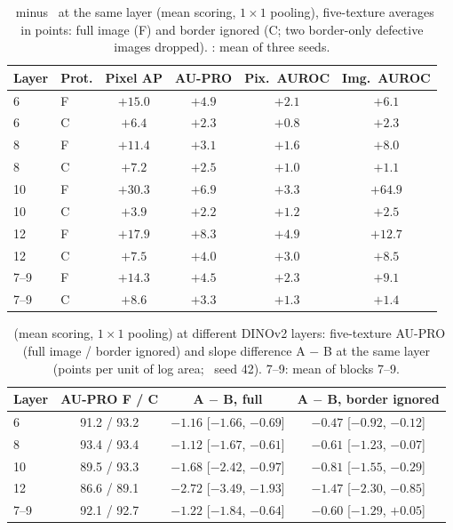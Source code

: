 \begin{table}[t]
\centering
\caption{\RB\ minus \RA\ at the same layer (mean scoring, $1\times1$
pooling), five-texture averages in points: full image (F) and border ignored
(C; two border-only defective images dropped). \RB: mean of three seeds.}
\label{tab:layergap}
\footnotesize
\setlength{\tabcolsep}{3pt}
\begin{tabular}{llcccc}
\toprule
Layer & Prot. & Pixel AP & AU-PRO & Pix.\ AUROC & Img.\ AUROC \\
\midrule
6    & F & $+15.0$ & $+4.9$ & $+2.1$ & $+6.1$ \\
6    & C & $+6.4$  & $+2.3$ & $+0.8$ & $+2.3$ \\
8    & F & $+11.4$ & $+3.1$ & $+1.6$ & $+8.0$ \\
8    & C & $+7.2$  & $+2.5$ & $+1.0$ & $+1.1$ \\
10   & F & $+30.3$ & $+6.9$ & $+3.3$ & $+64.9$ \\
10   & C & $+3.9$  & $+2.2$ & $+1.2$ & $+2.5$ \\
12   & F & $+17.9$ & $+8.3$ & $+4.9$ & $+12.7$ \\
12   & C & $+7.5$  & $+4.0$ & $+3.0$ & $+8.5$ \\
7--9 & F & $+14.3$ & $+4.5$ & $+2.3$ & $+9.1$ \\
7--9 & C & $+8.6$  & $+3.3$ & $+1.3$ & $+1.4$ \\
\bottomrule
\end{tabular}
\end{table}

\begin{table}[t]
\centering
\caption{\RA\ (mean scoring, $1\times1$ pooling) at different DINOv2 layers:
five-texture AU-PRO (full image / border ignored) and slope difference
A $-$ B at the same layer (points per unit of log area; \RB\ seed 42).
7--9: mean of blocks 7--9.}
\label{tab:layerslope}
\footnotesize
\setlength{\tabcolsep}{3pt}
\begin{tabular}{lccc}
\toprule
Layer & AU-PRO F / C & A $-$ B, full & A $-$ B, border ignored \\
\midrule
6    & 91.2 / 93.2 & $-1.16$ [$-1.66$, $-0.69$] & $-0.47$ [$-0.92$, $-0.12$] \\
8    & 93.4 / 93.4 & $-1.12$ [$-1.67$, $-0.61$] & $-0.61$ [$-1.23$, $-0.07$] \\
10   & 89.5 / 93.3 & $-1.68$ [$-2.42$, $-0.97$] & $-0.81$ [$-1.55$, $-0.29$] \\
12   & 86.6 / 89.1 & $-2.72$ [$-3.49$, $-1.93$] & $-1.47$ [$-2.30$, $-0.85$] \\
7--9 & 92.1 / 92.7 & $-1.22$ [$-1.84$, $-0.64$] & $-0.60$ [$-1.29$, $+0.05$] \\
\bottomrule
\end{tabular}
\end{table}
